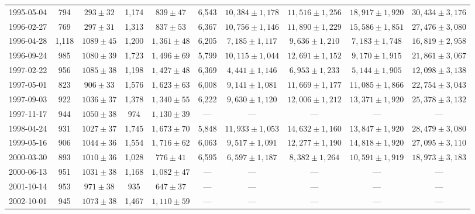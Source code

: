 \begin{landscape}
\begin{longtable}{cccccccccc}
{1995-05-04} & 794 & {$293  \pm  32$} & 1,174 & {$839 \pm 47$} & 6,543 & {$10,384 \pm 1,178$} & {$11,516 \pm 1,256$} & {$18,917 \pm 1,920$} & {$30,434 \pm 3,176$} \\
{1996-02-27} & 769 & {$297  \pm  31$} & 1,313 & {$837 \pm 53$} & 6,367 & {$10,756 \pm 1,146$} & {$11,890 \pm 1,229$} & {$15,586 \pm 1,851$} & {$27,476 \pm 3,080$} \\
{1996-04-28} & 1,118 & {$1089  \pm  45$} & 1,200 & {$1,361 \pm 48$} & 6,205 & {$7,185 \pm 1,117$} & {$9,636 \pm 1,210$} & {$7,183 \pm 1,748$} & {$16,819 \pm 2,958$} \\
{1996-09-24} & 985 & {$1080  \pm  39$} & 1,723 & {$1,496 \pm 69$} & 5,799 & {$10,115 \pm 1,044$} & {$12,691 \pm 1,152$} & {$9,170 \pm 1,915$} & {$21,861 \pm 3,067$} \\
{1997-02-22} & 956 & {$1085  \pm  38$} & 1,198 & {$1,427 \pm 48$} & 6,369 & {$4,441 \pm 1,146$} & {$6,953 \pm 1,233$} & {$5,144 \pm 1,905$} & {$12,098 \pm 3,138$} \\
{1997-05-01} & 823 & {$906  \pm  33$} & 1,576 & {$1,623 \pm 63$} & 6,008 & {$9,141 \pm 1,081$} & {$11,669 \pm 1,177$} & {$11,085 \pm 1,866$} & {$22,754 \pm 3,043$} \\
{1997-09-03} & 922 & {$1036  \pm  37$} & 1,378 & {$1,340 \pm 55$} & 6,222 & {$9,630 \pm 1,120$} & {$12,006 \pm 1,212$} & {$13,371 \pm 1,920$} & {$25,378 \pm 3,132$} \\
{1997-11-17} & 944 & {$1050  \pm  38$} & 974 & {$1,130 \pm 39$} & --- & --- & --- & --- & --- \\
{1998-04-24} & 931 & {$1027  \pm  37$} & 1,745 & {$1,673 \pm 70$} & 5,848 & {$11,933 \pm 1,053$} & {$14,632 \pm 1,160$} & {$13,847 \pm 1,920$} & {$28,479 \pm 3,080$} \\
{1999-05-16} & 906 & {$1044  \pm  36$} & 1,554 & {$1,716 \pm 62$} & 6,063 & {$9,517 \pm 1,091$} & {$12,277 \pm 1,190$} & {$14,818 \pm 1,920$} & {$27,095 \pm 3,110$} \\
{2000-03-30} & 893 & {$1010  \pm  36$} & 1,028 & {$776 \pm 41$} & 6,595 & {$6,597 \pm 1,187$} & {$8,382 \pm 1,264$} & {$10,591 \pm 1,919$} & {$18,973 \pm 3,183$} \\
{2000-06-13} & 951 & {$1031  \pm  38$} & 1,168 & {$1,082 \pm 47$} & --- & --- & --- & --- & --- \\
{2001-10-14} & 953 & {$971  \pm  38$} & 935 & {$647 \pm 37$} & --- & --- & --- & --- & --- \\
{2002-10-01} & 945 & {$1073  \pm  38$} & 1,467 & {$1,110 \pm 59$} & --- & --- & --- & --- & --- \\

\end{longtable}
\end{landscape}

